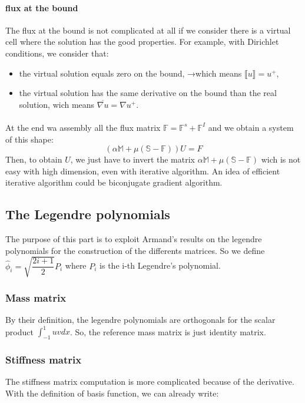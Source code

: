 \documentclass[a4paper,10pt,draft]{article}
\begin{document}
{\paragraph{flux at the bound}
The flux at the bound is not complicated at all if we consider there is a virtual cell where the 
solution has the good properties. For example, with Dirichlet conditions, we consider that:
\begin{itemize}
 \item the virtual solution equals zero on the bound, →which means $\llbracket u \rrbracket = u^+ $,
 \item the virtual solution has the same derivative on the bound than the real solution, wich means 
$\overline{\nabla u} = \nabla u^+$.
\end{itemize}
}
\fi
\paragraph{}
At the end wa assembly all the flux matrix $\mathbb{F} = \mathbb{F}^s +\mathbb{F}^I $ and we obtain 
a system of this shape:
\begin{equation}
\left(\alpha \mathbb{M} + \mu (\mathbb{S}-\mathbb{F})\right) U = F
\end{equation}
Then, to obtain $U$, we just have to invert the matrix $\alpha \mathbb{M} + \mu 
(\mathbb{S}-\mathbb{F})$ wich is not easy with high dimension, even with iterative algorithm. An 
idea of efficient iterative algorithm could be biconjugate gradient algorithm.

\subsection{The Legendre polynomials}

The purpose of this part is to exploit Armand's results on the legendre polynomials for the 
construction of the differents matrices. So we define $\hat \phi_i = \sqrt{\dfrac{2i+1}{2}} P_i$ 
where $P_i$ is the i-th Legendre's polynomial.

\subsubsection{Mass matrix}
By their definition, the legendre polynomials are orthogonals for the scalar product 
$\int_{-1}^1 uv dx$. So, the reference mass matrix is just identity matrix.

\subsubsection{Stiffness matrix}
The stiffness matrix computation is more complicated because of the derivative. With the 
definition of basis function, we can already write:
\end{document}
